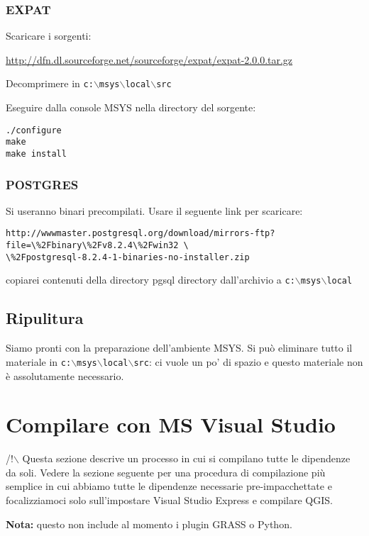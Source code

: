 \subsubsection{EXPAT}
Scaricare i sorgenti:

\url{http://dfn.dl.sourceforge.net/sourceforge/expat/expat-2.0.0.tar.gz}

Decomprimere in \texttt{c:$\backslash$msys$\backslash$local$\backslash$src}

Eseguire dalla console MSYS nella directory del sorgente:

\begin{verbatim}
./configure
make
make install
\end{verbatim}

\subsubsection{POSTGRES}
Si useranno binari precompilati. Usare il seguente link per scaricare:

\begin{verbatim}
http://wwwmaster.postgresql.org/download/mirrors-ftp?file=\%2Fbinary\%2Fv8.2.4\%2Fwin32 \
\%2Fpostgresql-8.2.4-1-binaries-no-installer.zip
\end{verbatim}

copiarei contenuti della directory pgsql directory dall'archivio a  \texttt{c:$\backslash$msys$\backslash$local}

\subsection{Ripulitura}
Siamo pronti con la preparazione dell'ambiente MSYS. Si può eliminare tutto il materiale in \texttt{c:$\backslash$msys$\backslash$local$\backslash$src}: ci vuole un po' di spazio e questo materiale non è assolutamente necessario.


\section{Compilare con MS Visual Studio}
/!$\backslash$ Questa sezione descrive un processo in cui si compilano tutte le dipendenze da soli. Vedere la sezione seguente per una procedura di compilazione più semplice in cui abbiamo tutte le dipendenze necessarie pre-impacchettate e focalizziamoci solo sull'impostare Visual Studio Express e compilare QGIS.

\textbf{Nota:} questo non include al momento i plugin GRASS o Python.


